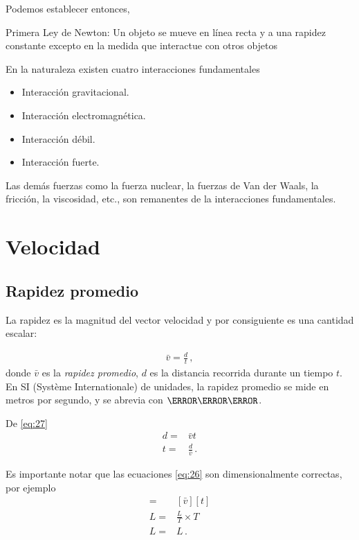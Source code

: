Podemos establecer entonces,

\begin{frame}
  \begin{block}{Primera Ley de Newton:}
    Un objeto se mueve en línea recta y a una rapidez constante
    excepto en la medida que interactue con otros objetos
  \end{block}
\end{frame}

En la naturaleza existen cuatro interacciones fundamentales
\begin{itemize}
\item Interacción gravitacional.
\item Interacción electromagnética.
\item Interacción débil.
\item Interacción fuerte.
\end{itemize}

Las demás fuerzas como la fuerza nuclear, la fuerzas de Van der Waals, la fricción, la viscosidad, etc., son remanentes de la interacciones fundamentales. 


\section{Velocidad}

\subsection{Rapidez promedio}
La rapidez es la magnitud del vector velocidad  y por consiguiente es una cantidad escalar:

\begin{align}
  \label{eq:27}
\bar{v}=\frac{d}{t}\,,
\end{align}
donde $\bar{v}$ es la \emph{rapidez promedio}, $d$ es la distancia
recorrida durante un tiempo $t$. En SI (Système Internationale) de
unidades, la rapidez promedio se mide en metros por segundo, y se
abrevia con $\meter\per\second$.

De \eqref{eq:27}
\begin{align}
  \label{eq:26}
  d=&\bar{v} t\nonumber\\
  t=&\frac{d}{\bar{v}}\,.
\end{align}

Es importante notar que las ecuaciones \eqref{eq:26} son dimensionalmente correctas, por ejemplo
\begin{align}
  [d]=&  \left[\bar{v}   \right] [t]\nonumber\\
  L=&\frac{L}{T}\times T\nonumber\\
  L=&L\,.
\end{align}

